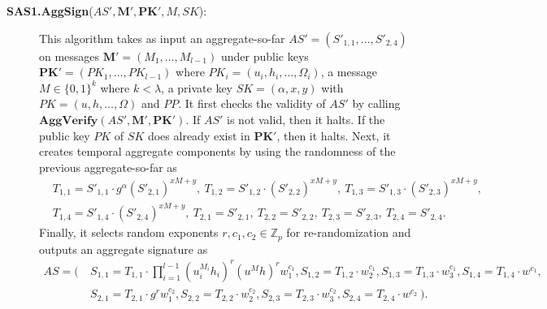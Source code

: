 \documentclass[11pt,letterpaper]{article}
\newcommand{\vect}[1]{\mathbf{#1}}
\newcommand{\Z}{\mathbb{Z}}
\newcommand{\bits}{\{0,1\}}
\begin{document}
\begin{description}
\item [\textbf{SAS1.AggSign}($AS', \vect{M}', \vect{PK}', M, SK$):] This
    algorithm takes as input an aggregate-so-far $AS' = (S'_{1,1}, \ldots,
    S'_{2,4})$ on messages $\vect{M}' = (M_1, \ldots, M_{l-1})$ under
    public keys $\vect{PK}' = (PK_1, \ldots, PK_{l-1})$ where $PK_i = (u_i,
    h_i, \ldots, \Omega_i)$, a message $M \in \bits^k$ where $k < \lambda$,
    a private key $SK = (\alpha, x, y)$ with $PK = (u, h, \ldots, \Omega)$
    and $PP$. It first checks the validity of $AS'$ by calling
    $\textbf{AggVerify} (AS', \vect{M}', \vect{PK}')$. If $AS'$ is not
    valid, then it halts. If the public key $PK$ of $SK$ does already exist
    in $\vect{PK}'$, then it halts. Next, it creates temporal aggregate
    components by using the randomness of the previous aggregate-so-far as
    \begin{align*}
    &   T_{1,1} = S'_{1,1} \cdot g^{\alpha} (S'_{2,1})^{xM + y},~
        T_{1,2} = S'_{1,2} \cdot (S'_{2,2})^{xM + y},~
        T_{1,3} = S'_{1,3} \cdot (S'_{2,3})^{xM + y},~ \\
    &   T_{1,4} = S'_{1,4} \cdot (S'_{2,4})^{xM + y},~
        T_{2,1} = S'_{2,1},~
        T_{2,2} = S'_{2,2},~
        T_{2,3} = S'_{2,3},~
        T_{2,4} = S'_{2,4}.
    \end{align*}
    Finally, it selects random exponents $r, c_1, c_2 \in \Z_p$ for
    re-randomization and outputs an aggregate signature as
    \begin{align*}
    AS = \Big(~
    &   S_{1,1} = T_{1,1} \cdot \prod_{i=1}^{l-1} (u_i^{M_i} h_i)^r (u^M h)^r
                  w_1^{c_1},
        S_{1,2} = T_{1,2} \cdot w_2^{c_1},
        S_{1,3} = T_{1,3} \cdot w_3^{c_1},
        S_{1,4} = T_{1,4} \cdot w^{c_1},~ \\
    &   S_{2,1} = T_{2,1} \cdot g^r w_1^{c_2},
        S_{2,2} = T_{2,2} \cdot w_2^{c_2},
        S_{2,3} = T_{2,3} \cdot w_3^{c_2},
        S_{2,4} = T_{2,4} \cdot w^{c_2}
    ~\Big).
    \end{align*}


\end{description}
\end{document}

